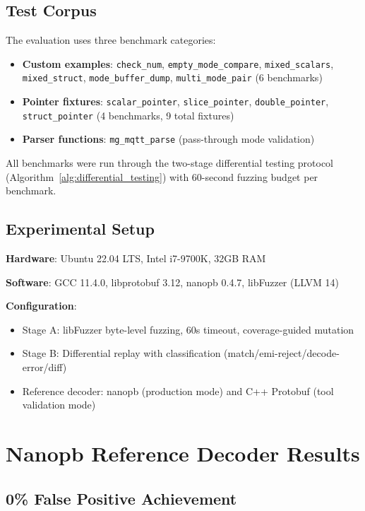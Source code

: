 \documentclass[doublespace,nopageskip]{VTthesis}
\begin{document}
\subsection{Test Corpus}

The evaluation uses three benchmark categories:
\begin{itemize}
    \item \textbf{Custom examples}: \texttt{check\_num}, \texttt{empty\_mode\_compare}, \texttt{mixed\_scalars}, \texttt{mixed\_struct}, \texttt{mode\_buffer\_dump}, \texttt{multi\_mode\_pair} (6 benchmarks)
    \item \textbf{Pointer fixtures}: \texttt{scalar\_pointer}, \texttt{slice\_pointer}, \texttt{double\_pointer}, \texttt{struct\_pointer} (4 benchmarks, 9 total fixtures)
    \item \textbf{Parser functions}: \texttt{mg\_mqtt\_parse} (pass-through mode validation)
\end{itemize}

All benchmarks were run through the two-stage differential testing protocol (Algorithm~\ref{alg:differential_testing}) with 60-second fuzzing budget per benchmark.

\subsection{Experimental Setup}

\textbf{Hardware}: Ubuntu 22.04 LTS, Intel i7-9700K, 32GB RAM

\textbf{Software}: GCC 11.4.0, libprotobuf 3.12, nanopb 0.4.7, libFuzzer (LLVM 14)

\textbf{Configuration}:
\begin{itemize}
    \item Stage A: libFuzzer byte-level fuzzing, 60s timeout, coverage-guided mutation
    \item Stage B: Differential replay with classification (match/emi-reject/decode-error/diff)
    \item Reference decoder: nanopb (production mode) and C++ Protobuf (tool validation mode)
\end{itemize}

\section{Nanopb Reference Decoder Results} \label{se:nanopb_reference_results}

\subsection{0\% False Positive Achievement}
\end{document}
